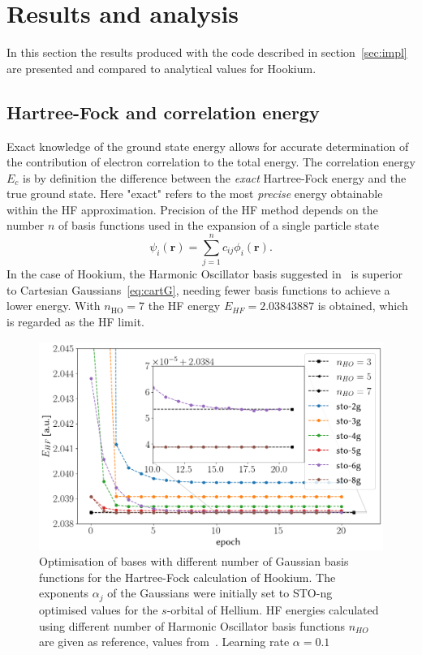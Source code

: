 \documentclass[final,3p,times,twocolumn]{elsarticle}
\begin{document}
	\section{Results and analysis}
	\label{sec:results}
	In this section the results produced with the code described in section~\ref{sec:impl} are presented and compared to analytical values for Hookium.

	\subsection{Hartree-Fock and correlation energy}
	Exact knowledge of the ground state energy allows for accurate determination of the contribution of electron correlation to the total energy. The correlation energy $E_c$ is by definition the difference between the \emph{exact} Hartree-Fock energy and the true ground state. Here "exact" refers to the most \emph{precise} energy obtainable within the HF approximation. Precision of the HF method depends on the number $n$ of basis functions used in the expansion of a single particle state
	\begin{equation}
		\psi_{i}(\mathbf{r})=\sum_{j=1}^{n} c_{i j} \phi_{i}(\mathbf{r}).
	\end{equation}
	In the case of Hookium, the Harmonic Oscillator basis suggested in~\cite{ONeill2003wave} is superior to Cartesian Gaussians~\eqref{eq:cartG}, needing fewer basis functions to achieve a lower energy. With $n_\text{HO}=7$ the HF energy $E_{HF} = 2.03843887$ is obtained, which is regarded as the HF limit. 	
	\begin{figure}[h]
		\centering
		\includegraphics[width=\linewidth]{../plots/HF_optimization}
		\caption{Optimisation of bases with different number of Gaussian basis functions for the Hartree-Fock calculation of Hookium. The exponents $\alpha_{j}$ of the Gaussians were initially set to STO-ng optimised values for the $s$-orbital of Hellium. HF energies calculated using different number of Harmonic Oscillator basis functions $n_{HO}$ are given as reference, values from~\cite{ONeill2003wave}. Learning rate $\alpha=0.1$}
		\label{fig:hfoptimization}
	\end{figure}
\end{document}
